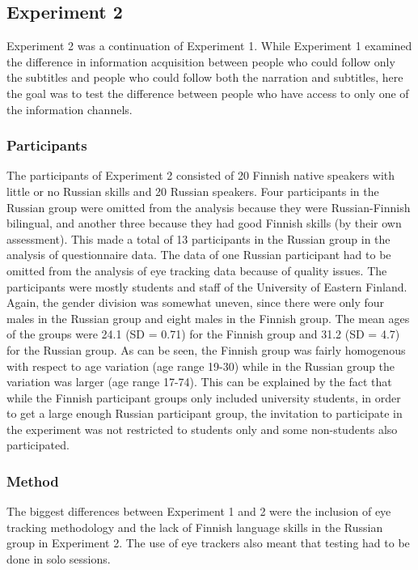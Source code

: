 \documentclass[output=paper]{langsci/langscibook}
\begin{document}
\subsection{Experiment 2}

Experiment 2 was a continuation of Experiment 1. While Experiment 1 examined the difference in information acquisition between people who could follow only the subtitles and people who could follow both the narration and subtitles, here the goal was to test the difference between people who have access to only one of the information channels. 

\subsubsection{Participants}

The participants of Experiment 2 consisted of 20 Finnish native speakers with little or no Russian skills and 20 Russian speakers. Four participants in the Russian group were omitted from the analysis because they were Russian-Finnish bilingual, and another three because they had good Finnish skills (by their own assessment). This made a total of 13 participants in the Russian group in the analysis of questionnaire data. The data of one Russian participant had to be omitted from the analysis of eye tracking data because of quality issues. The participants were mostly students and staff of the University of Eastern Finland. Again, the gender division was somewhat uneven, since there were only four males in the Russian group and eight males in the Finnish group. The mean ages of the groups were 24.1 (SD = 0.71) for the Finnish group and 31.2 (SD = 4.7) for the Russian group. As can be seen, the Finnish group was fairly homogenous with respect to age variation (age range 19-30) while in the Russian group the variation was larger (age range 17-74). This can be explained by the fact that while the Finnish participant groups only included university students, in order to get a large enough Russian participant group, the invitation to participate in the experiment was not restricted to students only and some non-students also participated. 

\subsubsection{Method}

The biggest differences between Experiment 1 and 2 were the inclusion of eye tracking methodology and the lack of Finnish language skills in the Russian group in Experiment 2. The use of eye trackers also meant that testing had to be done in solo sessions.
\end{document}
